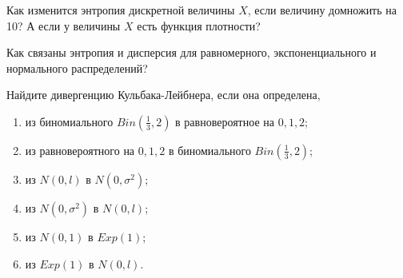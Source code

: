 \documentclass[12pt, a4paper, oneside]{article}
\begin{document}
\begin{problem}{}
Как изменится энтропия дискретной величины $X$, если величину домножить на 10? А если у величины $X$ есть функция плотности?
\end{problem}


\begin{problem}{}
Как связаны энтропия и дисперсия для равномерного, экспоненциального и
нормального распределений? 
\end{problem}


\begin{problem}{}
Найдите дивергенцию Кульбака-Лейбнера, если она определена, 

\begin{enumerate}
\item  из биномиального $Bin(\frac{1}{3}, 2)$ в равновероятное на $0,1,2$;
\item из равновероятного на $0,1,2$ в биномиального $Bin(\frac{1}{3}, 2)$;
\item из $N(0,l)$ в $N(0, \sigma^2)$;
\item из  $N(0, \sigma^2)$ в $N(0,l)$;
\item из $N(0,1)$ в $Exp(1)$;
\item из $Exp(1)$ в $N(0,l)$. 
\end{enumerate}
\end{problem}
\end{document}
